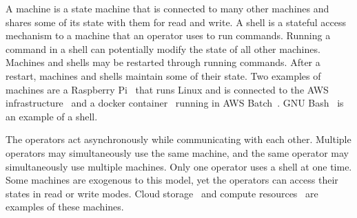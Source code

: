 A machine is a state machine that is connected to many other machines and shares some of its state with them for read and write. A shell is a stateful access mechanism to a machine that an operator uses to run commands. Running a command in a shell can potentially modify the state of all other machines. Machines and shells may be restarted through running commands. After a restart, machines and shells maintain some of their state. Two examples of machines are a Raspberry Pi~\cite{rpi} that runs Linux and is connected to the AWS infrastructure~\cite{aws} and a docker container~\cite{docker} running in AWS Batch~\cite{aws_batch}. GNU Bash~\cite{gnu_bash} is an example of a shell.

The operators act asynchronously while communicating with each other. Multiple operators may simultaneously use the same machine, and the same operator may simultaneously use multiple machines. Only one operator uses a shell at one time. Some machines are exogenous to this model, yet the operators can access their states in read or write modes. Cloud storage~\cite{aws_s3} and compute resources~\cite{aws_batch} are examples of these machines.